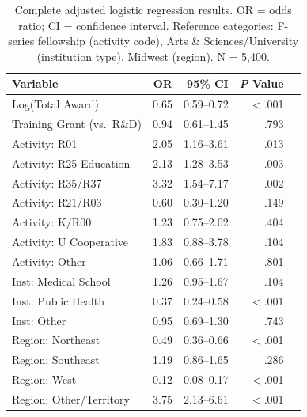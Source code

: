 \documentclass[10pt, letterpaper]{article}
\begin{document}
\begin{table}[H]
\centering
\sffamily\fontsize{8}{10}\selectfont
\begin{tabular}{lrrrr}
\toprule
\textbf{Variable} & \textbf{OR} & \textbf{95\% CI} & \textbf{\textit{P} Value} \\
\midrule
Log(Total Award)         & 0.65 & 0.59--0.72 & $<$.001 \\
Training Grant (vs.\ R\&D) & 0.94 & 0.61--1.45 & .793 \\
Activity: R01            & 2.05 & 1.16--3.61 & .013 \\
Activity: R25 Education  & 2.13 & 1.28--3.53 & .003 \\
Activity: R35/R37        & 3.32 & 1.54--7.17 & .002 \\
Activity: R21/R03        & 0.60 & 0.30--1.20 & .149 \\
Activity: K/R00          & 1.23 & 0.75--2.02 & .404 \\
Activity: U Cooperative  & 1.83 & 0.88--3.78 & .104 \\
Activity: Other          & 1.06 & 0.66--1.71 & .801 \\
Inst: Medical School     & 1.26 & 0.95--1.67 & .104 \\
Inst: Public Health      & 0.37 & 0.24--0.58 & $<$.001 \\
Inst: Other              & 0.95 & 0.69--1.30 & .743 \\
Region: Northeast        & 0.49 & 0.36--0.66 & $<$.001 \\
Region: Southeast        & 1.19 & 0.86--1.65 & .286 \\
Region: West             & 0.12 & 0.08--0.17 & $<$.001 \\
Region: Other/Territory  & 3.75 & 2.13--6.61 & $<$.001 \\
\bottomrule
\end{tabular}
\caption{Complete adjusted logistic regression results. OR = odds ratio; CI = confidence interval. Reference categories: F-series fellowship (activity code), Arts \& Sciences/University (institution type), Midwest (region). N = 5,400.}
\end{table}
\end{document}
